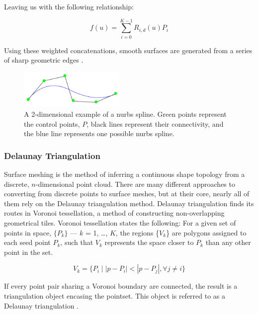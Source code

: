 \documentclass[12pt]{drexelthesis}
\let\Oldsubsubsection\subsubsection
\renewcommand{\subsubsection}{\FloatBarrier\Oldsubsubsection}
\begin{document}
 Leaving us with the following relationship:
 
 \begin{equation}
 	f(u) = \sum_{i=0}^{K-1} R_{i,d}(u) P_{i}
\end{equation}

Using these weighted concatenations, smooth surfaces are generated from a series of sharp geometric edges \cite{nurbs}.


\begin{figure}[!ht]
	\centering
		\includegraphics[width=2in]{cadTypes/nurbs.png}
	\caption[Example of a 2-dimensional nurbs spline.]{\centering A 2-dimensional example of a nurbs spline. Green points represent the control points, $P$, black lines represent their connectivity, and the blue line represents one possible nurbs spline.}
\end{figure}








\subsubsection{Delaunay Triangulation}
\label{subsubsec:delaunay}
Surface meshing is the method of inferring a continuous shape topology from a discrete, $n$-dimensional point cloud. There are many different approaches to converting from discrete points to surface meshes, but at their core, nearly all of them rely on the Delaunay triangulation method.
Delaunay triangulation finds its routes in Voronoi tessellation, a method of constructing non-overlapping geometrical tiles. Voronoi tessellation states the following:
For a given set of points in space, $\{P_{k}\}$ --- $k$ = 1, \ldots, $K$, the regions \{$V_{k}$\} are polygons assigned to each seed point $P_{k}$, such that $V_{k}$ represents the space closer to $P_{k}$ than any other point in the set.

\begin{equation}
	V_{k} = \{P_{i} \mid |p - P_{i}| < |p - P_{j}|, \forall j \neq i \}
\end{equation}

If every point pair sharing a Voronoi boundary are connected, the result is a triangulation object encasing the pointset. This object is referred to as a Delaunay triangulation \cite{RN65}.
\end{document}

